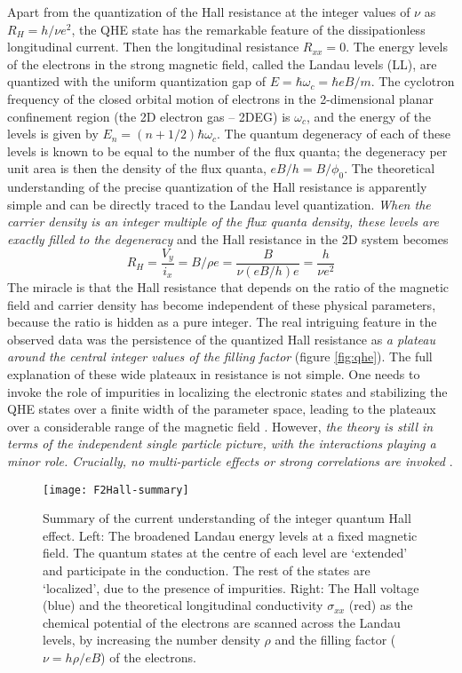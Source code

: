\documentclass[aps,preprint,12pt,tightenlines]{revtex4}%
\begin{document}
Apart from the quantization of the Hall resistance at the integer values of
$\nu$ as $R_{H}=h/\nu e^{2}$, the QHE state has the remarkable feature of the
dissipationless longitudinal current. Then the longitudinal resistance
$R_{xx}=0$. The energy levels of the electrons in the strong magnetic field,
called the Landau levels (LL), are quantized with the uniform quantization gap of
$E=\hbar\omega_{c}=\hbar eB/m.$ The cyclotron frequency of the closed orbital
motion of electrons in the 2-dimensional planar confinement region (the 2D
electron gas -- 2DEG) is $\omega_{c}$, and the energy of the levels is given
by $E_{n}=\left(  n+1/2\right)  \hbar\omega_{c}.$ The quantum degeneracy of
each of these levels is known to be equal to the number of the flux quanta;
the degeneracy per unit area is then the density of the flux quanta,
$eB/h=B/\phi_{0}$. The theoretical understanding of the precise quantization
of the Hall resistance is apparently simple and can be directly traced to the
Landau level quantization. \emph{When the carrier density is an integer
multiple of the flux quanta density, these levels are exactly filled to the
degeneracy} and the Hall resistance in the 2D system becomes
\begin{equation}
R_{H}=\frac{V_{y}}{i_{x}}=B/\rho e=\frac{B}{\nu\left(  eB/h\right)  e}%
=\frac{h}{\nu e^{2}}%
\end{equation}
The miracle is that the Hall resistance that depends on the ratio of the
magnetic field and carrier density has become independent of these physical
parameters, because the ratio is hidden as a pure integer. The real intriguing
feature in the observed data was the persistence of the quantized Hall
resistance as \emph{a plateau around the central integer values of the filling
factor} (figure \ref{fig:qhe}). The full explanation of these wide plateaux in
resistance is not simple. One needs to invoke the role of impurities in
localizing the electronic states and stabilizing the QHE states over a finite
width of the parameter space, leading to the plateaux over a considerable
range of the magnetic field \cite{Laughlin-1983}. However, \emph{the theory
is still in terms of the independent single particle picture, with the
interactions playing a minor role. Crucially, no multi-particle effects or
strong correlations are invoked} \cite{QHE-book}.

\begin{figure}
	\centering
	\texttt{[image: F2Hall-summary]}
	\caption{Summary of the current understanding of the integer quantum Hall effect. Left: The broadened Landau energy levels at a fixed magnetic field. The quantum states at the centre of each level are `extended' and participate in the conduction. The rest of the states are `localized', due to the presence of impurities. Right: The Hall voltage (blue) and the theoretical longitudinal conductivity $\sigma_{xx}$ (red) as the chemical potential of the electrons are scanned across the Landau levels, by increasing the number density $\rho$ and the filling factor ($\nu=h\rho/eB$) of the electrons.}
	\label{fig:hall-summary}
\end{figure}
\end{document}
